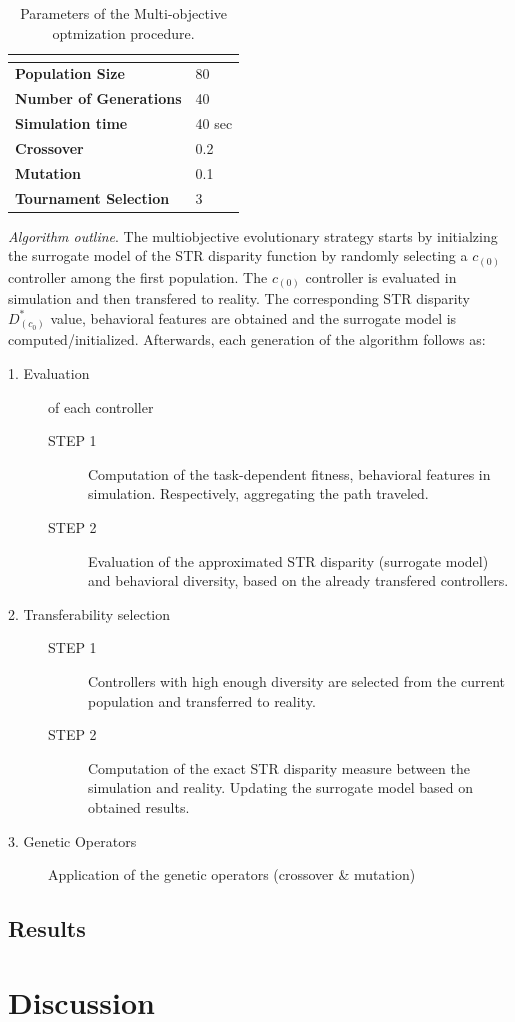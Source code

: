 \begin{table}[H]
\begin{tabular}{ll}
\hline
\textbf{}                      & \textbf{} \\ \hline
\textbf{Population Size}       & 80        \\
\textbf{Number of Generations} & 40        \\
\textbf{Simulation time}       & 40 sec    \\
\textbf{Crossover}             & 0.2       \\
\textbf{Mutation}              & 0.1       \\
\textbf{Tournament Selection}  & 3        
\end{tabular}
\caption{Parameters of the Multi-objective optmization procedure.}
\label{tab:moea_parameters}
\end{table}


\emph{Algorithm outline}. The multiobjective evolutionary strategy starts by initialzing the surrogate model of the STR disparity function by randomly selecting a $c_{(0)}$ controller among the first population. The $c_{(0)}$ controller is evaluated in simulation and then transfered to reality. The corresponding STR disparity $ D^{*}_{(c_0)}$ value, behavioral features are obtained and the surrogate model is computed/initialized. Afterwards, each generation of the algorithm follows as:

\begin{description}
	\item[1. Evaluation] of each controller
		\begin{description}
			\item[STEP 1] Computation of the task-dependent fitness, behavioral features in simulation. Respectively, aggregating the path traveled.
			\item[STEP 2] Evaluation of the approximated STR disparity (surrogate model) and behavioral diversity, based on the already transfered controllers.
		\end{description}
	\item[2. Transferability selection] 
		\begin{description}
			\item[STEP 1] Controllers with high enough diversity are selected from the current population and transferred to reality.
			\item[STEP 2] Computation of the exact STR disparity measure between the simulation and reality. Updating the surrogate model based on obtained results.
		\end{description}
	\item[3. Genetic Operators] Application of the genetic operators (crossover & mutation)
\end{description}


\subsection{Results}

\section{Discussion}



